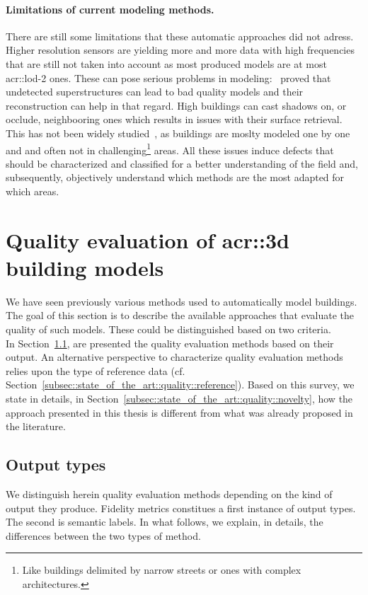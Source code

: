         \paragraph{Limitations of current modeling methods.}
            There are still some limitations that these automatic approaches did not adress.
            Higher resolution sensors are yielding more and more data with high frequencies that are still not taken into account as most produced models are at most \gls{acr::lod}-2 ones.
            These can pose serious problems in modeling:~\textcite{bredif20073d} proved that undetected superstructures can lead to bad quality models and their reconstruction can help in that regard.
            High buildings can cast shadows on, or occlude, neighbooring ones which results in issues with their surface retrieval.
            This has not been widely studied~\parencite{lafarge2012creating,bao2013generating}, as buildings are moslty modeled one by one and and often not in challenging\footnote{
                Like buildings delimited by narrow streets or ones with complex architectures.
            } areas.
            All these issues induce defects that should be characterized and classified for a better understanding of the field and, subsequently, objectively understand which methods are the most adapted for which areas.

\section{Quality evaluation of \texorpdfstring{\gls*{acr::3d}}{3D} building models}
    \label{sec::state_of_the_art::quality}
    We have seen previously various methods used to automatically model buildings.
    The goal of this section is to describe the available approaches that evaluate the quality of such models.
    These could be distinguished based on two criteria.\\

    In Section~\ref{subsec::state_of_the_art::quality::output}, are presented the quality evaluation methods based on their output.
    An alternative perspective to characterize quality evaluation methods relies upon the type of reference data (cf. Section~\ref{subsec::state_of_the_art::quality::reference}).
    Based on this survey, we state in details, in Section~\ref{subsec::state_of_the_art::quality::novelty}, how the approach presented in this thesis is different from what was already proposed in the literature.

    \subsection{Output types}
        \label{subsec::state_of_the_art::quality::output}
        We distinguish herein quality evaluation methods depending on the kind of output they produce.
        Fidelity metrics constitues a first instance of output types.
        The second is semantic labels.
        In what follows, we explain, in details, the differences between the two types of method.

